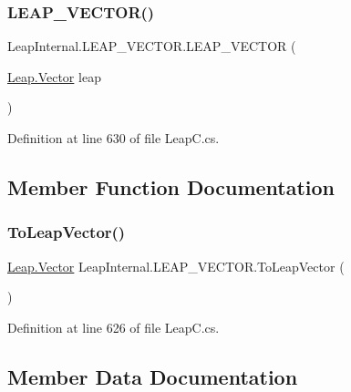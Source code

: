 \subsubsection{\texorpdfstring{LEAP\_VECTOR()}{LEAP\_VECTOR()}}
{\footnotesize\ttfamily Leap\+Internal.\+L\+E\+A\+P\+\_\+\+V\+E\+C\+T\+O\+R.\+L\+E\+A\+P\+\_\+\+V\+E\+C\+T\+OR (\begin{DoxyParamCaption}\item[{\mbox{\hyperlink{struct_leap_1_1_vector}{Leap.\+Vector}}}]{leap }\end{DoxyParamCaption})}



Definition at line 630 of file Leap\+C.\+cs.



\subsection{Member Function Documentation}
\mbox{\label{struct_leap_internal_1_1_l_e_a_p___v_e_c_t_o_r_a6c8581a40c7fcc33f66e6e0732eb097a}} 
\subsubsection{\texorpdfstring{ToLeapVector()}{ToLeapVector()}}
{\footnotesize\ttfamily \mbox{\hyperlink{struct_leap_1_1_vector}{Leap.\+Vector}} Leap\+Internal.\+L\+E\+A\+P\+\_\+\+V\+E\+C\+T\+O\+R.\+To\+Leap\+Vector (\begin{DoxyParamCaption}{ }\end{DoxyParamCaption})}



Definition at line 626 of file Leap\+C.\+cs.



\subsection{Member Data Documentation}
\mbox{\label{struct_leap_internal_1_1_l_e_a_p___v_e_c_t_o_r_a5a641abc075b71fc0a9f3bed31a2d0f0}} 
